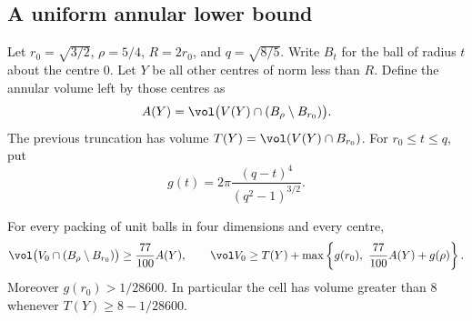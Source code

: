 \subsection{A uniform annular lower bound}
\label{sec:annular-bound}

Let \(r_0=\sqrt{3/2}\), \(\rho=5/4\), \(R=2r_0\), and
\(q=\sqrt{8/5}\). Write \(B_t\) for the ball of radius \(t\) about
the centre \(0\). Let \(Y\) be all other centres of norm less than \(R\).
Define the annular volume left by those centres as
\[
 A(Y)=\vol\bigl(V(Y)\cap(B_\rho\setminus B_{r_0})\bigr).
\]
The previous truncation has volume
\(T(Y)=\vol(V(Y)\cap B_{r_0})\).
For \(r_0\le t\le q\), put
\[
 g(t)=2\pi\frac{(q-t)^4}{(q^2-1)^{3/2}} .
\]

\begin{thm}\label{thm:annular-bound}
For every packing of unit balls in four dimensions and every centre,
\[
 \vol\bigl(V_0\cap(B_\rho\setminus B_{r_0})\bigr)
 \ge \frac{77}{100} A(Y),\qquad
 \vol V_0\ge T(Y)+
 \max\left\{g(r_0),\ \frac{77}{100}A(Y)+g(\rho)\right\}.
\]
Moreover \(g(r_0)>1/28600\). In particular the cell has volume greater
than \(8\) whenever \(T(Y)\ge 8-1/28600\).
\end{thm}


